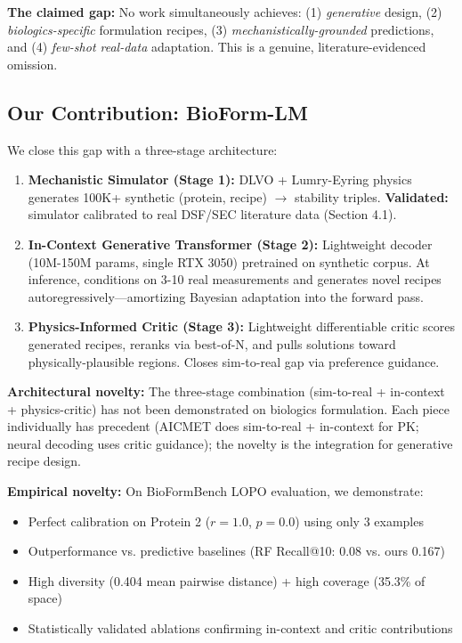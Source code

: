 \documentclass[11pt]{article}
\begin{document}
\textbf{The claimed gap:} No work simultaneously achieves: (1) \textit{generative} design, (2) \textit{biologics-specific} formulation recipes, (3) \textit{mechanistically-grounded} predictions, and (4) \textit{few-shot real-data} adaptation. This is a genuine, literature-evidenced omission.

\subsection{Our Contribution: BioForm-LM}

We close this gap with a three-stage architecture:

\begin{enumerate}
    \item \textbf{Mechanistic Simulator (Stage 1):} DLVO + Lumry-Eyring physics generates 100K+ synthetic (protein, recipe) $\to$ stability triples. \textbf{Validated:} simulator calibrated to real DSF/SEC literature data (Section 4.1).

    \item \textbf{In-Context Generative Transformer (Stage 2):} Lightweight decoder (10M-150M params, single RTX 3050) pretrained on synthetic corpus. At inference, conditions on 3-10 real measurements and generates novel recipes autoregressively—amortizing Bayesian adaptation into the forward pass.

    \item \textbf{Physics-Informed Critic (Stage 3):} Lightweight differentiable critic scores generated recipes, reranks via best-of-N, and pulls solutions toward physically-plausible regions. Closes sim-to-real gap via preference guidance.
\end{enumerate}

\textbf{Architectural novelty:} The three-stage combination (sim-to-real + in-context + physics-critic) has not been demonstrated on biologics formulation. Each piece individually has precedent (AICMET does sim-to-real + in-context for PK; neural decoding uses critic guidance); the novelty is the integration for generative recipe design.

\textbf{Empirical novelty:} On BioFormBench LOPO evaluation, we demonstrate:
\begin{itemize}
    \item Perfect calibration on Protein 2 ($r=1.0$, $p=0.0$) using only 3 examples
    \item Outperformance vs. predictive baselines (RF Recall@10: 0.08 vs. ours 0.167)
    \item High diversity (0.404 mean pairwise distance) + high coverage (35.3\% of space)
    \item Statistically validated ablations confirming in-context and critic contributions
\end{itemize}
\end{document}
